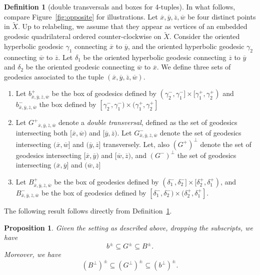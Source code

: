 \documentclass[12pt,article]{amsart}
\numberwithin{equation}{section}
\numberwithin{figure}{section}
\newtheorem{proposition}[equation]{Proposition}
\theoremstyle{definition}
\newtheorem{definition}[equation]{Definition}
\theoremstyle{plain}
\newcommand*{\wt}[1]{\widetilde{#1}}
\begin{document}
\begin{definition}[double transversals and boxes for 4-tuples]
In what follows, compare Figure~\ref{fig:opposite} for illustrations.
Let $\overline{x},\overline{y},\overline{z},\overline{w}$ be four distinct points in $\wt{X}$. Up to relabeling, we assume that they appear as vertices of an embedded geodesic quadrilateral ordered counter-clockwise on $\wt{X}$. Consider the oriented hyperbolic geodesic $\gamma_1$ connecting $\overline{x}$ to $\overline{y}$, and the oriented hyperbolic geodesic $\gamma_2$ connecting $\overline{w}$ to $\overline{z}$. Let $\delta_1$ be the oriented hyperbolic geodesic connecting $\overline{z}$ to $\overline{y}$ and $\delta_2$ be the oriented geodesic connecting $\overline{w}$ to $\overline{x}$. We define three sets of geodesics associated to the tuple $(\overline{x},\overline{y},\overline{z},\overline{w})$. 
\begin{enumerate}
    \item Let $b^+_{\overline{x},\overline{y},\overline{z},\overline{w}}$ be the box of geodesics defined by $(\gamma_2^-, \gamma_1^-] \times [\gamma_1^+,\gamma_2^+)$ and 
    $b^-_{\overline{x},\overline{y},\overline{z},\overline{w}}$ the box defined by $[\gamma_2^-, \gamma_1^-) \times (\gamma_1^+,\gamma_2^+]$
    \item Let ${G^{+}}_{\overline{x},\overline{y},\overline{z},\overline{w}}$ denote a \emph{double transversal}, defined as the set of geodesics intersecting both $[\overline{x},\overline{w})$ and $[\overline{y},\overline{z})$. Let $G^{-}_{\overline{x},\overline{y},\overline{z},\overline{w}}$ denote the set of geodesics intersecting $(\overline{x},\overline{w}]$ and $(\overline{y},\overline{z}]$ transversely.
    Let, also $(G^+)^{\perp}$ denote the set of geodesics intersecting  $[\overline{x},\overline{y})$ and $[\overline{w},\overline{z})$, and $(G^-)^{\perp}$ the set of geodesics intersecting $(\overline{x},\overline{y}]$ and $(\overline{w},\overline{z}]$
    \item Let $B^+_{\overline{x},\overline{y},\overline{z},\overline{w}}$ be the box of geodesics defined by $(\delta_1^-, \delta_2^-] \times [\delta_2^+,\delta_1^+)$, and 
    $B^-_{\overline{x},\overline{y},\overline{z},\overline{w}}$ be the box of geodesics defined by $[\delta_1^-, \delta_2^-) \times (\delta_2^+,\delta_1^+]$.
\end{enumerate}
\label{def:boxes_transverse}
\end{definition}

The following result follows directly from Definition~\ref{def:boxes_transverse}.
\begin{proposition}
Given the setting as described above, dropping the subscripts, we have
\[
b^{\pm} \subseteq G^{\pm} \subseteq B^{\pm}.
\]
Moreover, we have
\[
(B^{\perp})^{\pm} \subseteq (G^{\perp})^{\pm} \subseteq (b^{\perp})^{\pm}.
\]
\label{prop:boxes_transverse}
\end{proposition}
\end{document}
